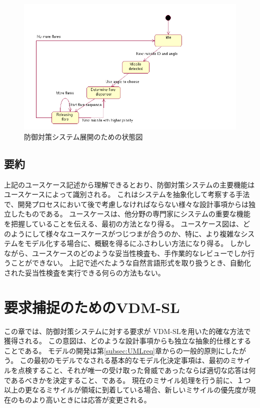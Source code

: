 \documentclass[\pformat,12pt]{jreport}
\begin{document}
\begin{figure}
\begin{center}
\includegraphics[width=\textwidth]{CMstate}
\end{center}
\caption{防御対策システム展開のための状態図\label{fig:counterstate}}
\end{figure}

\subsection{要約}

上記のユースケース記述から理解できるとおり、防御対策システムの主要機能はユースケースによって識別される。
これはシステムを抽象化して考察する手法で、開発プロセスにおいて後で考慮しなければならない様々な設計事項からは独立したものである。
ユースケースは、他分野の専門家にシステムの重要な機能を把握していることを伝える、最初の方法となり得る。
ユースケース図は、どのようにして様々なユースケースがつじつまが合うのか、特に、より複雑なシステムをモデル化する場合に、概観を得るにふさわしい方法になり得る。
しかしながら、ユースケースのどのような妥当性検査も、手作業的なレビューでしか行うことができない。
上記で述べたような自然言語形式を取り扱うとき、自動化された妥当性検査を実行できる何らの方法もない。

\section{要求捕捉のためのVDM-SL}\label{sec:VDMSLreq}\label{sec:VDMSL}

この章では、防御対策システムに対する要求が VDM-SLを用いた的確な方法で獲得される。 
この意図は、どのような設計事項からも独立な抽象的仕様とすることである。
モデルの開発は第\ref{subsec:UMLreq}章からの一般的原則にしたがう。 
この最初のモデルでなされる基本的なモデル化決定事項は、最初のミサイルを点検すること、それが唯一の受け取った脅威であったならば適切な応答は何であるべきかを決定すること、である。
現在のミサイル処理を行う前に、１つ以上の更なるミサイルが領域に到着している場合、新しいミサイルの優先度が現在のものより高いときには応答が変更される。
\end{document}
